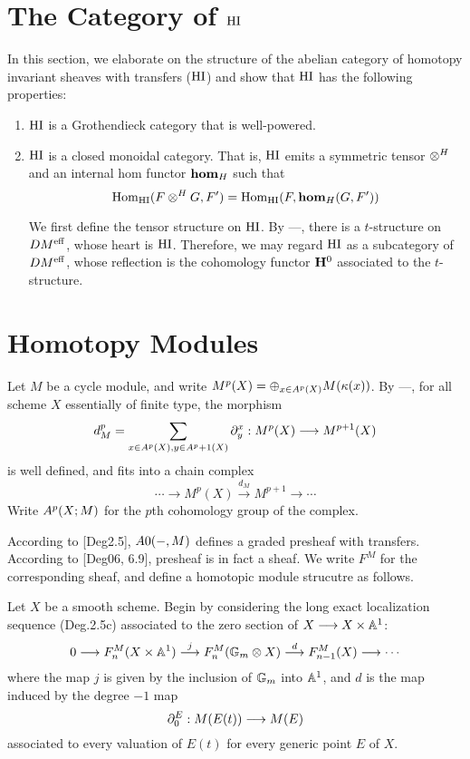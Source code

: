 \section{The Category of $\HI$}

\newcommand{\loopCM}{\epsilon}

In this section, we elaborate on the structure of the abelian
category of homotopy invariant sheaves with transfers ($\HI$) and 
show that $\HI$ has the following properties:

\begin{enumerate}

\item $\HI$ is a Grothendieck category that is well-powered.

\item $\HI$ is a closed monoidal category. That is, $\HI$ 
emits a symmetric tensor $\htensor$ and an internal hom
functor $\hhom$ such that
\[
\hom_{\HI}(F \htensor G, F') = \hom_{\HI}(F, \hhom(G, F'))
\]

We first define the tensor structure on $\HI$. By ---, there
is a $t$-structure on $\DMeff$, whose heart is $\HI$. Therefore, 
we may regard $\HI$ as a subcategory of $\DMeff$, whose 
reflection is the cohomology functor $\H^0$ associated to the
$t$-structure.
\end{enumerate}

\section{Homotopy Modules}

Let $M$ be a cycle module, and write $M^p(X) = \oplus_{x \in 
\subsch{p}{X}} M(\resf{x})$. By ---, for all scheme $X$ 
essentially of finite type, the morphism
\[
d_M^p = \sum_{x \in \subsch{p}{X}, y \in \subsch{p + 1}{X}} 
\ptres{x}{y} : M^p(X) \to M^{p + 1}(X)
\]
is well defined, and fits into a chain complex
\[
\cdots \to M^p(X) \stackrel{d_M}{\to} M^{p + 1} \to \cdots
\]
Write $\cmcohom^p(X; M)$ for the $p$th cohomology group of the 
complex.

According to [Deg2.5], $\cmcohom{0}(-,M)$ defines a graded 
presheaf with transfers. According to [Deg06, 6.9], presheaf is 
in fact a sheaf. We write $F^M$ for the corresponding sheaf, and 
define a homotopic module strucutre as follows.

Let $X$ be a smooth scheme. Begin by considering the long exact
localization sequence (Deg.2.5c) associated to the zero section of
$X \to X \times \A^1$:
\[
0 \to F^M_n(X \times \A^1) \stackrel{j}{\to} F^M_n(\Gmpt \otimes X) 
   \stackrel{d}{\to} F^M_{n - 1}(X) \to \cdots
\]
where the map $j$ is given by the inclusion of $\Gmpt$ into $\A^1$,
and $d$ is the map induced by the degree $-1$ map
\[
\ptres{E}{0}: M(E(t)) \to M(E)
\]
associated to every valuation of $E(t)$ for every generic point 
$E$ of $X$.

